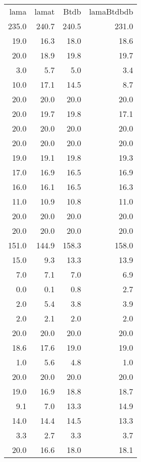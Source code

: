 \begin{center}
\begin{tabular}{rrrr}
lama & lamat & Btdb & lamaBtdbdb\\
235.0 & 240.7 & 240.5 & 231.0\\
19.0 & 16.3 & 18.0 & 18.6\\
20.0 & 18.9 & 19.8 & 19.7\\
3.0 & 5.7 & 5.0 & 3.4\\
10.0 & 17.1 & 14.5 & 8.7\\
20.0 & 20.0 & 20.0 & 20.0\\
20.0 & 19.7 & 19.8 & 17.1\\
20.0 & 20.0 & 20.0 & 20.0\\
20.0 & 20.0 & 20.0 & 20.0\\
19.0 & 19.1 & 19.8 & 19.3\\
17.0 & 16.9 & 16.5 & 16.9\\
16.0 & 16.1 & 16.5 & 16.3\\
11.0 & 10.9 & 10.8 & 11.0\\
20.0 & 20.0 & 20.0 & 20.0\\
20.0 & 20.0 & 20.0 & 20.0\\
151.0 & 144.9 & 158.3 & 158.0\\
15.0 & 9.3 & 13.3 & 13.9\\
7.0 & 7.1 & 7.0 & 6.9\\
0.0 & 0.1 & 0.8 & 2.7\\
2.0 & 5.4 & 3.8 & 3.9\\
2.0 & 2.1 & 2.0 & 2.0\\
20.0 & 20.0 & 20.0 & 20.0\\
18.6 & 17.6 & 19.0 & 19.0\\
1.0 & 5.6 & 4.8 & 1.0\\
20.0 & 20.0 & 20.0 & 20.0\\
19.0 & 16.9 & 18.8 & 18.7\\
9.1 & 7.0 & 13.3 & 14.9\\
14.0 & 14.4 & 14.5 & 13.3\\
3.3 & 2.7 & 3.3 & 3.7\\
20.0 & 16.6 & 18.0 & 18.1\\
\end{tabular}
\end{center}
